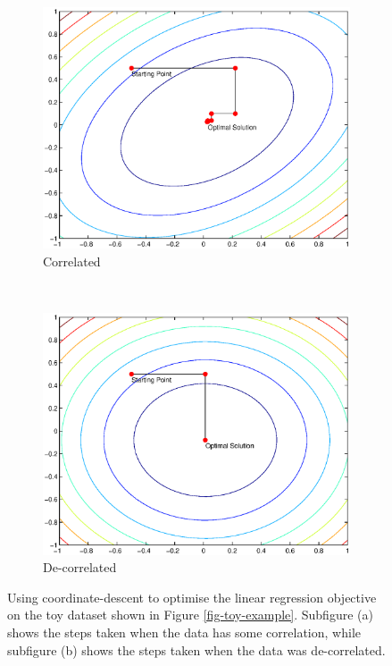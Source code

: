 \documentclass[useAMS,usenatbib,fleqn]{mn2e}
\begin{document}
\begin{figure}
        \centering
        \begin{subfigure}[b]{0.45\columnwidth}
                 \includegraphics[width=\textwidth]{figures/correlated.eps}
                 \caption{Correlated}
        \end{subfigure}
        ~
        \begin{subfigure}[b]{0.45\columnwidth}
                 \includegraphics[width=\textwidth]{figures/decorrelated.eps}
                 \caption{De-correlated}
        \end{subfigure}
       \caption{Using coordinate-descent to optimise the linear regression objective on the toy dataset shown in Figure \ref{fig-toy-example}. Subfigure (a) shows the steps taken when the data has some correlation, while subfigure (b) shows the steps taken when the data was de-correlated.} 
	\label{fig-error-surface}
\end{figure}
\end{document}
